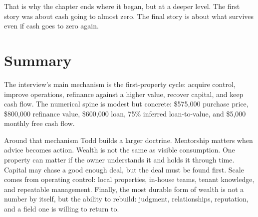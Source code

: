 That is why the chapter ends where it began, but at a deeper level. The first story was about cash going to almost zero. The final story is about what survives even if cash goes to zero again.

\section{Summary}

The interview's main mechanism is the first-property cycle: acquire control, improve operations, refinance against a higher value, recover capital, and keep cash flow. The numerical spine is modest but concrete: \$575,000 purchase price, \$800,000 refinance value, \$600,000 loan, 75\% inferred loan-to-value, and \$5,000 monthly free cash flow.

Around that mechanism Todd builds a larger doctrine. Mentorship matters when advice becomes action. Wealth is not the same as visible consumption. One property can matter if the owner understands it and holds it through time. Capital may chase a good enough deal, but the deal must be found first. Scale comes from operating control: local properties, in-house teams, tenant knowledge, and repeatable management. Finally, the most durable form of wealth is not a number by itself, but the ability to rebuild: judgment, relationships, reputation, and a field one is willing to return to.